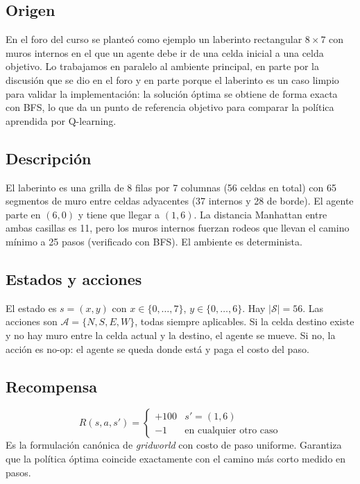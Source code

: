 \documentclass[11pt,a4paper]{article}
\begin{document}
\subsection{Origen}

En el foro del curso se planteó como ejemplo un laberinto rectangular
\(8\times 7\) con muros internos en el que un agente debe ir de una celda
inicial a una celda objetivo. Lo trabajamos en paralelo al ambiente
principal, en parte por la discusión que se dio en el foro y en parte
porque el laberinto es un caso limpio para validar la implementación: la
solución óptima se obtiene de forma exacta con BFS, lo que da un punto de
referencia objetivo para comparar la política aprendida por Q-learning.

\subsection{Descripción}

El laberinto es una grilla de \num{8} filas por \num{7} columnas
(\num{56} celdas en total) con \num{65} segmentos de muro entre celdas
adyacentes (37 internos y 28 de borde). El agente parte en \((6,0)\) y
tiene que llegar a \((1,6)\). La distancia Manhattan entre ambas casillas
es \num{11}, pero los muros internos fuerzan rodeos que llevan el camino
mínimo a \num{25} pasos (verificado con BFS). El ambiente es determinista.

\subsection{Estados y acciones}

El estado es \(s = (x, y)\) con \(x\in\{0,\ldots,7\}\),
\(y\in\{0,\ldots,6\}\). Hay \(|\mathcal{S}|=56\). Las acciones son
\(\mathcal{A}=\{N, S, E, W\}\), todas siempre aplicables. Si la celda
destino existe y no hay muro entre la celda actual y la destino, el agente
se mueve. Si no, la acción es no-op: el agente se queda donde está y paga
el costo del paso.

\subsection{Recompensa}

\[
  R(s, a, s') =
  \begin{cases}
    +100 & s' = (1,6) \\
    -1   & \text{en cualquier otro caso}
  \end{cases}
\]
Es la formulación canónica de \emph{gridworld} con costo de paso uniforme.
Garantiza que la política óptima coincide exactamente con el camino más
corto medido en pasos.
\end{document}

